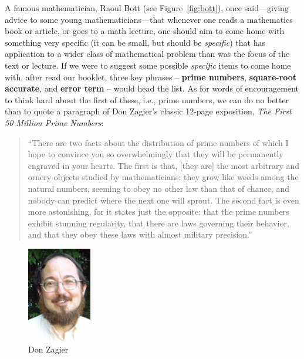 \documentclass[11pt,draft]{article}
\theoremstyle{plain}
\theoremstyle{definition}
\numberwithin{equation}{section}
\numberwithin{figure}{section}
\numberwithin{table}{section}
\begin{document}
A famous mathematician, Raoul Bott (see Figure~\ref{fig:bott}), once
said---giving advice to some young mathematicians---that whenever one
reads a mathematics book or article, or goes to a math lecture, one
should aim to come home with something very specific (it can be small,
but should be {\em specific}) that has application to a wider class of
mathematical problem than was the focus of the text or lecture.  If we
were to suggest some possible {\em specific} items to come home with,
after read our booklet, three key phrases -- {\bf prime numbers}, {\bf
  square-root accurate}, and {\bf error term} -- would head the
list. As for words of encouragement to think hard about the first of
these, i.e., prime numbers, we can do no better than to quote a
paragraph of Don Zagier's classic 12-page exposition, {\em The First
  50 Million Prime Numbers}:
    
\begin{quote}                      
  ``There are two facts about the distribution of prime numbers of
  which I hope to convince you so overwhelmingly that they will be
  permanently engraved in your hearts. The first is that, [they are]
  the most arbitrary and ornery objects studied by mathematicians:
  they grow like weeds among the natural numbers, seeming to obey no
  other law than that of chance, and nobody can predict where the next
  one will sprout. The second fact is even more astonishing, for it
  states just the opposite: that the prime numbers exhibit stunning
  regularity, that there are laws governing their behavior, and that
  they obey these laws with almost military precision.''
\end{quote}
                    
\begin{figure}[H]\label{fig:zagier}
\begin{center}
\includegraphics[width=0.25\textwidth]{illustrations/zagier}
\caption{Don Zagier}
\end{center}
\end{figure}
\end{document}
